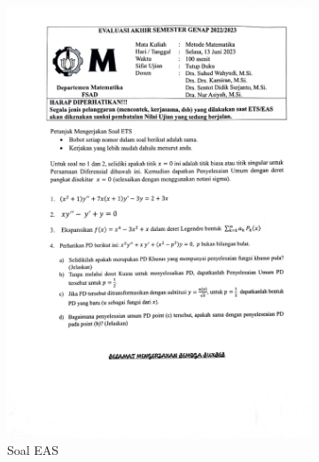 \documentclass[aspectratio=169,10pt]{beamer}
\begin{document}
\begin{frame}
\begin{itemize}
\begin{figure}[h!]
\begin{subfigure}[b]{0.15\linewidth}
          \includegraphics[width=\linewidth]{EAS METMAT 2023.pdf}
          \caption{Soal EAS}
          \label{fig:EAS}
        \end{subfigure}
        \begin{subfigure}[b]{0.17\linewidth}

\end{subfigure}
\end{figure}
\end{itemize}
\end{frame}
\end{document}
